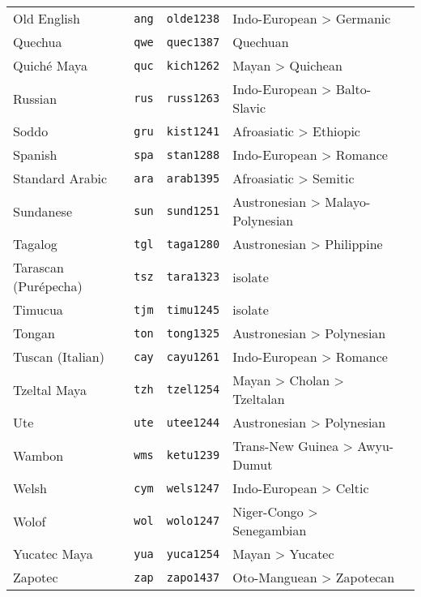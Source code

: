 \begin{longtable}[c]{ l l l l l }
  Old English                      & \texttt{ang}       & \texttt{olde1238}   & Indo-European > Germanic\\
  Quechua                          & \texttt{qwe}       & \texttt{quec1387}   & Quechuan\\
  Quiché Maya                      & \texttt{quc}       & \texttt{kich1262}   & Mayan > Quichean\\
  Russian                          & \texttt{rus}       & \texttt{russ1263}   & Indo-European > Balto-Slavic\\
  Soddo                            & \texttt{gru}       & \texttt{kist1241}   & Afroasiatic > Ethiopic\\
  Spanish                          & \texttt{spa}       & \texttt{stan1288}   & Indo-European > Romance\\
  Standard Arabic                  & \texttt{ara}       & \texttt{arab1395}   & Afroasiatic > Semitic\\
  Sundanese                        & \texttt{sun}       & \texttt{sund1251}   & Austronesian > Malayo-Polynesian\\
  Tagalog                          & \texttt{tgl}       & \texttt{taga1280}   & Austronesian > Philippine\\
  Tarascan (Purépecha)             & \texttt{tsz}       & \texttt{tara1323}   & isolate\\
  Timucua                          & \texttt{tjm}       & \texttt{timu1245}   & isolate\\
  Tongan                           & \texttt{ton}       & \texttt{tong1325}   & Austronesian > Polynesian\\
  Tuscan (Italian)                 & \texttt{cay}       & \texttt{cayu1261}   & Indo-European > Romance\\
  Tzeltal Maya                     & \texttt{tzh}       & \texttt{tzel1254}   & Mayan > Cholan > Tzeltalan\\
  Ute                              & \texttt{ute}       & \texttt{utee1244}   & Austronesian > Polynesian\\
  Wambon                           & \texttt{wms}       & \texttt{ketu1239}   & Trans-New Guinea > Awyu-Dumut\\
  Welsh                            & \texttt{cym}       & \texttt{wels1247}   & Indo-European > Celtic\\
  Wolof                            & \texttt{wol}       & \texttt{wolo1247}   & Niger-Congo > Senegambian\\
  Yucatec Maya                     & \texttt{yua}       & \texttt{yuca1254}   & Mayan > Yucatec\\
  Zapotec                          & \texttt{zap}       & \texttt{zapo1437}   & Oto-Manguean > Zapotecan\\
\end{longtable}
